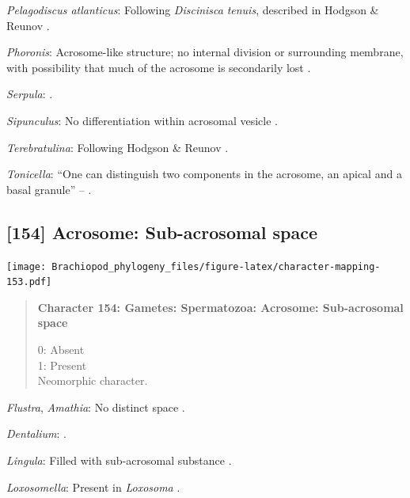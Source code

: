 \documentclass[openany]{book}
\begin{document}
\hypertarget{Pelagodiscus_atlanticus-coding-153}{}
\emph{Pelagodiscus atlanticus}: Following \emph{Discinisca}
\emph{tenuis}, described in Hodgson \& Reunov
\citeyearpar{Hodgson1994Ultrastructureof}.

\hypertarget{Phoronis-coding-153}{}
\emph{Phoronis}: Acrosome-like structure; no internal division or
surrounding membrane, with possibility that much of the acrosome is
secondarily lost \citep{Reunov2004Ultrastructuralstudy}.

\hypertarget{Serpula-coding-153}{}
\emph{Serpula}: \citet{Gherardi2011}.

\hypertarget{Sipunculus-coding-153}{}
\emph{Sipunculus}: No differentiation within acrosomal vesicle
\citep{Rice1993}.

\hypertarget{Terebratulina-coding-153}{}
\emph{Terebratulina}: Following Hodgson \& Reunov
\citeyearpar{Hodgson1994Ultrastructureof}.

\hypertarget{Tonicella-coding-153}{}
\emph{Tonicella}: ``One can distinguish two components in the acrosome,
an apical and a basal granule'' -- \citet{BucklandNicks1988}.

\subsection*{{[}154{]} Acrosome: Sub-acrosomal
space}\label{acrosome-sub-acrosomal-space}

\texttt{[image: Brachiopod\_phylogeny\_files/figure-latex/character-mapping-153.pdf]}

\begin{quote}
\textbf{Character 154: Gametes: Spermatozoa: Acrosome: Sub-acrosomal
space}

0: Absent\\
1: Present\\
Neomorphic character.
\end{quote}

\hypertarget{Amathia-coding-154}{}
\emph{Flustra}, \emph{Amathia}: No distinct space \citep[in
\emph{Tubulipora};][]{Franzen1984}.

\hypertarget{Dentalium-coding-154}{}
\emph{Dentalium}: \citet{DufresneDube1983}.

\hypertarget{Lingula-coding-154}{}
\emph{Lingula}: Filled with sub-acrosomal substance
\citep{Fukumoto2003Theacrosome}.

\hypertarget{Loxosomella-coding-154}{}
\emph{Loxosomella}: Present in \emph{Loxosoma} \citep{Franzen2000}.
\end{document}

